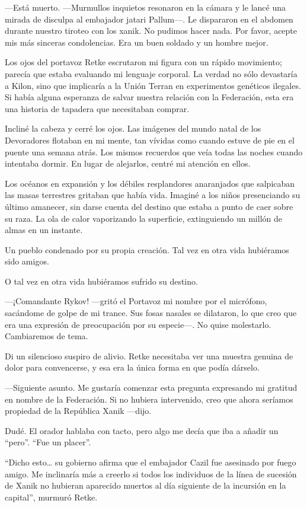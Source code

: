 —Está muerto. —Murmullos inquietos resonaron en la cámara y le lancé una mirada de disculpa al embajador jatari Pallum—. Le dispararon en el abdomen durante nuestro tiroteo con los xanik. No pudimos hacer nada. Por favor, acepte mis más sinceras condolencias. Era un buen soldado y un hombre mejor.

Los ojos del portavoz Retke escrutaron mi figura con un rápido movimiento; parecía que estaba evaluando mi lenguaje corporal. La verdad no sólo devastaría a Kilon, sino que implicaría a la Unión Terran en experimentos genéticos ilegales. Si había alguna esperanza de salvar nuestra relación con la Federación, esta era una historia de tapadera que necesitaban comprar.

Incliné la cabeza y cerré los ojos. Las imágenes del mundo natal de los Devoradores flotaban en mi mente, tan vívidas como cuando estuve de pie en el puente una semana atrás. Los mismos recuerdos que veía todas las noches cuando intentaba dormir. En lugar de alejarlos, centré mi atención en ellos.

Los océanos en expansión y los débiles resplandores anaranjados que salpicaban las masas terrestres gritaban que había vida. Imaginé a los niños presenciando su último amanecer, sin darse cuenta del destino que estaba a punto de caer sobre su raza. La ola de calor vaporizando la superficie, extinguiendo un millón de almas en un instante.

Un pueblo condenado por su propia creación. Tal vez en otra vida hubiéramos sido amigos.

O tal vez en otra vida hubiéramos sufrido su destino.

—¡Comandante Rykov! —gritó el Portavoz mi nombre por el micrófono, sacándome de golpe de mi trance. Sus fosas nasales se dilataron, lo que creo que era una expresión de preocupación por su especie—. No quise molestarlo. Cambiaremos de tema.

Di un silencioso suspiro de alivio. Retke necesitaba ver una muestra genuina de dolor para convencerse, y esa era la única forma en que podía dárselo.

—Siguiente asunto. Me gustaría comenzar esta pregunta expresando mi gratitud en nombre de la Federación. Si no hubiera intervenido, creo que ahora seríamos propiedad de la República Xanik —dijo.

Dudé. El orador hablaba con tacto, pero algo me decía que iba a añadir un ``pero''. ``Fue un placer''.

``Dicho esto… su gobierno afirma que el embajador Cazil fue asesinado por fuego amigo. Me inclinaría más a creerlo si todos los individuos de la línea de sucesión de Xanik no hubieran aparecido muertos al día siguiente de la incursión en la capital'', murmuró Retke.

